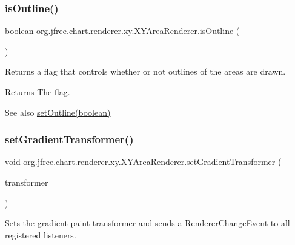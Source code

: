 \subsubsection{\texorpdfstring{is\+Outline()}{isOutline()}}
{\footnotesize\ttfamily boolean org.\+jfree.\+chart.\+renderer.\+xy.\+X\+Y\+Area\+Renderer.\+is\+Outline (\begin{DoxyParamCaption}{ }\end{DoxyParamCaption})}

Returns a flag that controls whether or not outlines of the areas are drawn.

\begin{DoxyReturn}{Returns}
The flag.
\end{DoxyReturn}
\begin{DoxySeeAlso}{See also}
\mbox{\hyperlink{classorg_1_1jfree_1_1chart_1_1renderer_1_1xy_1_1_x_y_area_renderer_aebd1a9e5609ccec9870b084f12b969d1}{set\+Outline(boolean)}} 
\end{DoxySeeAlso}
\mbox{\label{classorg_1_1jfree_1_1chart_1_1renderer_1_1xy_1_1_x_y_area_renderer_a37f754b20916387c639251cf4383533e}} 
\subsubsection{\texorpdfstring{set\+Gradient\+Transformer()}{setGradientTransformer()}}
{\footnotesize\ttfamily void org.\+jfree.\+chart.\+renderer.\+xy.\+X\+Y\+Area\+Renderer.\+set\+Gradient\+Transformer (\begin{DoxyParamCaption}\item[{Gradient\+Paint\+Transformer}]{transformer }\end{DoxyParamCaption})}

Sets the gradient paint transformer and sends a \mbox{\hyperlink{}{Renderer\+Change\+Event}} to all registered listeners.


